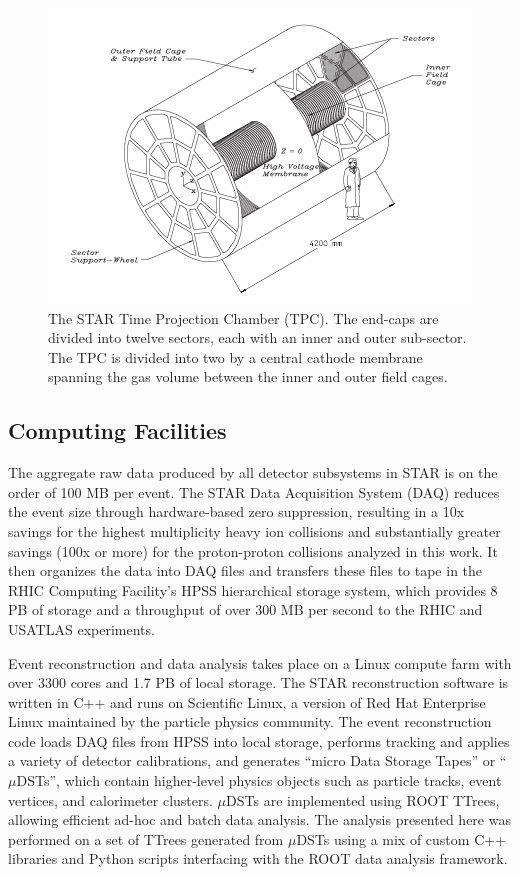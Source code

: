 \begin{figure}
  \includegraphics[width=1.0\textwidth]{figures/tpc}
  \caption{The STAR Time Projection Chamber (TPC). The end-caps are divided
  into twelve sectors, each with an inner and outer sub-sector. The TPC is
  divided into two by a central cathode membrane spanning the gas volume
  between the inner and outer field cages.}
  \label{fig:tpc}
\end{figure}

\subsection{Computing Facilities}

The aggregate raw data produced by all detector subsystems in STAR is on the
order of 100 MB per event. The STAR Data Acquisition System (DAQ)
\cite{Landgraf:2002zw} reduces the event size through hardware-based zero
suppression, resulting in a 10x savings for the highest multiplicity heavy ion
collisions and substantially greater savings (100x or more) for the
proton-proton collisions analyzed in this work. It then organizes the data
into DAQ files and transfers these files to tape in the RHIC Computing
Facility's HPSS hierarchical storage system, which provides 8 PB of storage
and a throughput of over 300 MB per second to the RHIC and USATLAS
experiments.

Event reconstruction and data analysis takes place on a Linux compute farm
with over 3300 cores and 1.7 PB of local storage. The STAR reconstruction
software is written in C++ and runs on Scientific Linux, a version of Red Hat
Enterprise Linux maintained by the particle physics community. The event
reconstruction code loads DAQ files from HPSS into local storage, performs
tracking and applies a variety of detector calibrations, and generates ``micro
Data Storage Tapes'' or ``$\mu$DSTs'', which contain higher-level physics
objects such as particle tracks, event vertices, and calorimeter clusters.
$\mu$DSTs are implemented using ROOT \cite{Brun:1997pa} TTrees, allowing
efficient ad-hoc and batch data analysis. The analysis presented here was
performed on a set of TTrees generated from $\mu$DSTs using a mix of custom
C++ libraries and Python scripts interfacing with the ROOT data analysis
framework.
